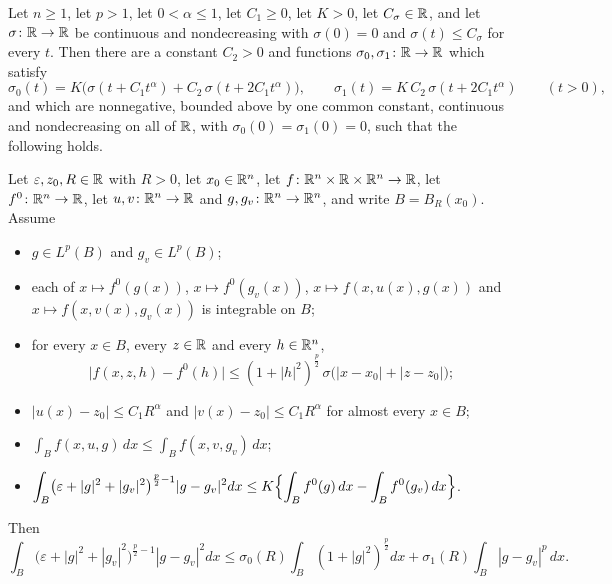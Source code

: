 \begin{lemma}
Let $n\ge1$, let $p>1$, let $0<\alpha\le1$, let $C_1\ge0$, let $K>0$, let
$C_\sigma\in\mathbb{R}$, and let $\sigma\colon\mathbb{R}\to\mathbb{R}$ be continuous and nondecreasing
with $\sigma(0)=0$ and $\sigma(t)\le C_\sigma$ for every $t$.  Then there are a
constant $C_2>0$ and functions $\sigma_0,\sigma_1\colon\mathbb{R}\to\mathbb{R}$ which satisfy
\[
\sigma_0(t)=K\bigl(\sigma(t+C_1t^{\alpha})+C_2\,\sigma(t+2C_1t^{\alpha})\bigr),
\qquad
\sigma_1(t)=K\,C_2\,\sigma(t+2C_1t^{\alpha})
\qquad(t>0),
\]
and which are nonnegative, bounded above by one common constant, continuous and
nondecreasing on all of $\mathbb{R}$, with $\sigma_0(0)=\sigma_1(0)=0$, such that the
following holds.

Let $\varepsilon,z_0,R\in\mathbb{R}$ with $R>0$, let $x_0\in\mathbb{R}^n$, let
$f\colon\mathbb{R}^n\times\mathbb{R}\times\mathbb{R}^n\to\mathbb{R}$, let $f^0\colon\mathbb{R}^n\to\mathbb{R}$, let
$u,v\colon\mathbb{R}^n\to\mathbb{R}$ and $g,g_v\colon\mathbb{R}^n\to\mathbb{R}^n$, and write $B=B_R(x_0)$.
Assume
\begin{itemize}
\item $g\in L^p(B)$ and $g_v\in L^p(B)$;
\item each of $x\mapsto f^0(g(x))$, $x\mapsto f^0(g_v(x))$,
  $x\mapsto f(x,u(x),g(x))$ and $x\mapsto f(x,v(x),g_v(x))$ is integrable on
  $B$;
\item for every $x\in B$, every $z\in\mathbb{R}$ and every $h\in\mathbb{R}^n$,
  \[
  \bigl|f(x,z,h)-f^0(h)\bigr|
  \le(1+|h|^2)^{\frac p2}\,\sigma\bigl(|x-x_0|+|z-z_0|\bigr);
  \]
\item $|u(x)-z_0|\le C_1R^{\alpha}$ and $|v(x)-z_0|\le C_1R^{\alpha}$ for
  almost every $x\in B$;
\item $\displaystyle\int_Bf(x,u,g)\,dx\le\int_Bf(x,v,g_v)\,dx$;
\item $\displaystyle\int_B\bigl(\varepsilon+|g|^2+|g_v|^2\bigr)^{\frac p2-1}
  |g-g_v|^2dx\le K\Bigl\{\int_Bf^0(g)\,dx-\int_Bf^0(g_v)\,dx\Bigr\}$.
\end{itemize}
Then
\[
\int_B\bigl(\varepsilon+|g|^2+|g_v|^2\bigr)^{\frac p2-1}|g-g_v|^2dx
\le\sigma_0(R)\int_B(1+|g|^2)^{\frac p2}dx
+\sigma_1(R)\int_B|g-g_v|^{p}\,dx .
\]
\end{lemma}
